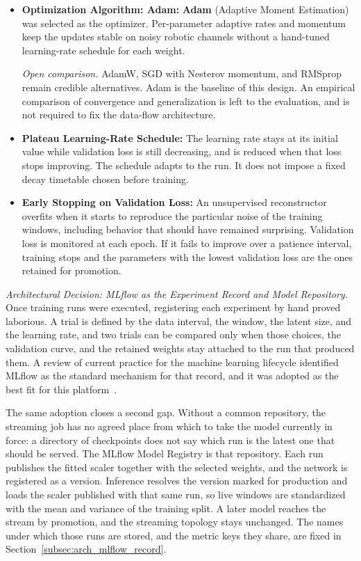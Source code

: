 \begin{itemize}
    \item \textbf{Optimization Algorithm: Adam:}
    \textbf{Adam} (Adaptive Moment Estimation) was selected as the optimizer. Per-parameter adaptive rates and momentum keep the updates stable on noisy robotic channels without a hand-tuned learning-rate schedule for each weight.

    \textit{Open comparison.} AdamW, SGD with Nesterov momentum, and RMSprop remain credible alternatives. Adam is the baseline of this design. An empirical comparison of convergence and generalization is left to the evaluation, and is not required to fix the data-flow architecture.

    \item \textbf{Plateau Learning-Rate Schedule:}
    The learning rate stays at its initial value while validation loss is still decreasing, and is reduced when that loss stops improving. The schedule adapts to the run. It does not impose a fixed decay timetable chosen before training.

    \item \textbf{Early Stopping on Validation Loss:}
    An unsupervised reconstructor overfits when it starts to reproduce the particular noise of the training windows, including behavior that should have remained surprising. Validation loss is monitored at each epoch. If it fails to improve over a patience interval, training stops and the parameters with the lowest validation loss are the ones retained for promotion.
\end{itemize}

\textit{Architectural Decision: MLflow as the Experiment Record and Model Repository.}
Once training runs were executed, registering each experiment by hand proved laborious. A trial is defined by the data interval, the window, the latent size, and the learning rate, and two trials can be compared only when those choices, the validation curve, and the retained weights stay attached to the run that produced them. A review of current practice for the machine learning lifecycle identified MLflow as the standard mechanism for that record, and it was adopted as the best fit for this platform~\cite{mlflow}.

The same adoption closes a second gap. Without a common repository, the streaming job has no agreed place from which to take the model currently in force: a directory of checkpoints does not say which run is the latest one that should be served. The MLflow Model Registry is that repository. Each run publishes the fitted scaler together with the selected weights, and the network is registered as a version. Inference resolves the version marked for production and loads the scaler published with that same run, so live windows are standardized with the mean and variance of the training split. A later model reaches the stream by promotion, and the streaming topology stays unchanged. The names under which those runs are stored, and the metric keys they share, are fixed in Section~\ref{subsec:arch_mlflow_record}.

